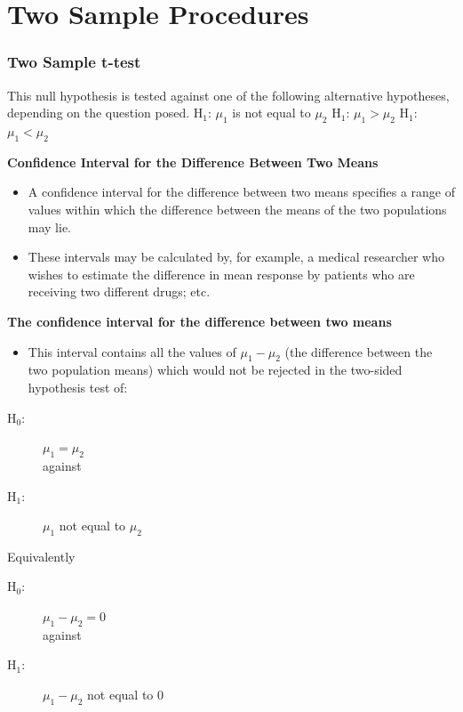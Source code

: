 \documentclass{beamer}
\begin{document}
\section{Two Sample Procedures}
\begin{frame}
	\frametitle{Two Sample t-test}
	This null hypothesis is tested against one of the
	following alternative hypotheses, depending on the question posed.
	H$_1$: $\mu_1$ is not equal to $\mu_2$
	H$_1$: $\mu_1 > \mu_2$
	H$_1$: $\mu_1 < \mu_2$
\end{frame}
\begin{frame}
	\noindent \textbf{Confidence Interval for the Difference Between Two Means}
	\begin{itemize}
		\item 	A confidence interval for the difference between two means
		specifies a range of values within which the difference between the
		means of the two populations may lie.
		\item These intervals may be calculated by, for example, a medical
		researcher who wishes to estimate the difference in mean response
		by patients who are receiving two different drugs; etc.
	\end{itemize}
\end{frame}
\begin{frame}
	\noindent \textbf{The confidence interval for the difference between two means}
	
	\begin{itemize}
		\item This interval	contains all the values of $\mu_1 - \mu_2$ (the difference between the two
		population means) which would not be rejected in the two-sided
		hypothesis test of:
	\end{itemize}
	\begin{description}
		\item[H$_0$:] $\mu_1 = \mu_2$
		\\against
		\item[H$_1$:] $\mu_1$ not equal to $\mu_2$
	\end{description}
	
	Equivalently
	\begin{description}
		\item[H$_0$:] $\mu_1 - \mu_2 = 0$
		\\against
		\item[H$_1$:] $\mu_1 - \mu_2$ not equal to 0
	\end{description}
	
\end{frame}
\end{document}
